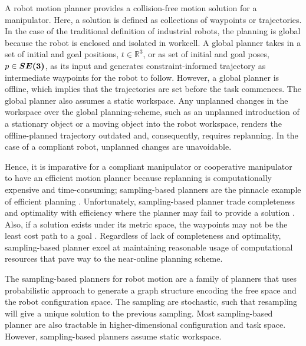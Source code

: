 \documentclass[a4paper, 10pt]{article}
\numberwithin{equation}{section} %
\begin{document}
A robot motion planner provides a
collision-free motion solution for a manipulator.
Here, a solution is defined as collections of waypoints or trajectories. 
In the case of the traditional definition of industrial robots, 
the planning is global because the robot is enclosed and isolated
in workcell. A global planner takes in a set of initial and goal 
positions, $t \in \mathbb{R}^3$, or as set of initial and goal poses, $p \in \vb*{SE(3)}$, as its
input and generates constraint-informed trajectory as intermediate waypoints
for the robot to follow. 
However, a global planner is offline, which implies that the trajectories 
are set before the task commences. The global planner also 
assumes a static workspace. 
Any unplanned changes in the workspace over the global planning-scheme, 
such as an unplanned introduction of a  stationary object or 
a moving object into the robot workspace, renders the 
offline-planned trajectory outdated and, consequently, requires replanning. 
In the case
of a compliant robot, unplanned changes are unavoidable.

Hence, it
is imparative for a compliant manipulator or cooperative manipulator 
to have an efficient motion planner because replanning is computationally expensive and time-consuming; 
sampling-based planners are the pinnacle example
of efficient planning \parencite{Elbanhawi2014}. 
Unfortunately, sampling-based planner
trade completeness and optimality with efficiency where %
the planner may fail to
provide a solution \parencite{Kavraki1998}. Also, if a solution exists 
under its metric space, 
the waypoints may 
not be the least cost path to a goal \parencite{LaValle1998}. 
Regardless of lack of
completeness and optimality, sampling-based planner
excel at maintaining reasonable usage of computational
resources that pave way to the near-online planning scheme.

The sampling-based planners for robot motion
are a family of planners that
uses probabilistic approach to generate a graph structure
encoding the free space and the robot configuration space.
The sampling are stochastic, such that resampling
will give a unique solution to the previous sampling. Most 
sampling-based planner are also tractable in higher-dimensional
configuration and task space. However, 
sampling-based planners assume static workspace. 

\end{document}
